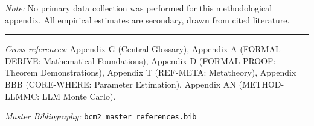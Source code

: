 \noindent\textit{Note:} No primary data collection was performed for this methodological
appendix. All empirical estimates are secondary, drawn from cited literature.



\vspace{1em}
\hrule
\vspace{0.5em}

\noindent\textit{Cross-references:}
Appendix G (Central Glossary),
Appendix A (FORMAL-DERIVE: Mathematical Foundations),
Appendix D (FORMAL-PROOF: Theorem Demonstrations),
Appendix T (REF-META: Metatheory),
Appendix BBB (CORE-WHERE: Parameter Estimation),
Appendix AN (METHOD-LLMMC: LLM Monte Carlo).

\noindent\textit{Master Bibliography:} \texttt{bcm2\_master\_references.bib}

